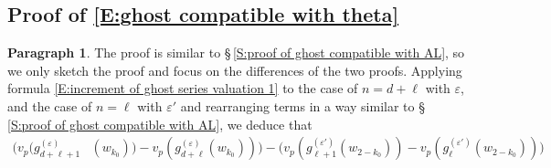 \documentclass[12pt]{amsart}
\theoremstyle{definition}
\newtheorem{para}[subsection]{Paragraph}
\numberwithin{equation}{subsection}
\newcommand{\midd}{\mathrm{mid}}
\begin{document}
\subsection{Proof of \eqref{E:ghost compatible with theta}}
\label{S:proof of ghost compatible with theta}
\begin{para}
\label{P:para_143}
The proof is similar to \S\,\ref{S:proof of ghost compatible with AL}, so we only sketch the proof and focus on the differences of the two proofs.
Applying formula \eqref{E:increment of ghost series valuation 1} to the case of $n=d+\ell$ with $\varepsilon$, and the case of $n=\ell$ with $\varepsilon'$ and rearranging terms in a way similar to \S\,\ref{S:proof of ghost compatible with AL}, we deduce that
\begin{align}
\nonumber
\big( v_p(g^{(\varepsilon)}_{d+\ell+1}& (w_{k_0}))-v_p(g^{(\varepsilon)}_{d+\ell}(w_{k_0})) \big) - \big( v_p(g^{(\varepsilon')}_{\ell+1}(w_{2-{k_0}}))-v_p(g^{(\varepsilon')}_{\ell}(w_{2-{k_0}})) \big)

\end{align}
\end{para}
\end{document}
